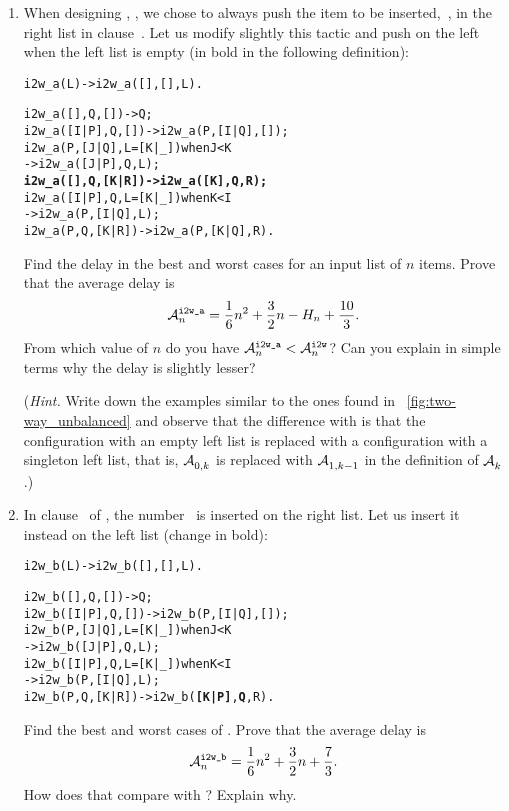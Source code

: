 
\begin{enumerate}

  \item \label{ins:ex:1} When designing ,
    , we chose to always push the item
    to be inserted,~, in the right list in
    clause~\clause{\epsilon}. Let us modify slightly this tactic and
    push on the left when the left list is empty (in bold in the
    following definition):
\begin{alltt}
i2w_a(L) -> i2w_a([],[],L).

i2w_a(   [],    Q,     []) -> Q;
i2w_a([I|P],    Q,     []) -> i2w_a(    P,[I|Q],[]);
i2w_a(    P,[J|Q],L=[K|_]) when J < K 
                           -> i2w_a([J|P],    Q, L);
\textbf{i2w_a(   [],    Q,  [K|R]) -> i2w_a(  [K],    Q, R);}
i2w_a([I|P],    Q,L=[K|_]) when K < I
                           -> i2w_a(    P,[I|Q], L);
i2w_a(    P,    Q,  [K|R]) -> i2w_a(    P,[K|Q], R).
\end{alltt}
Find the delay in the best and worst cases for an input list of \(n\)
items. Prove that the average delay is
\[
\ave{i2w\_a}{n} = \frac{1}{6}{n^2} + \frac{3}{2}{n} - H_n +
\frac{10}{3}.
\]
From which value of \(n\) do you have \(\ave{i2w\_a}{n} <
\ave{i2w}{n}\)? Can you explain in simple terms why the delay is
slightly lesser?

\noindent (\emph{Hint.} Write down the examples similar to the ones
found in \fig~\vref{fig:two-way_unbalanced} and observe that the
difference with  is that the configuration with an
empty left list is replaced with a configuration with a singleton left
list, that is, \(\ave{}{0,k}\) is replaced with \(\ave{}{1,k-1}\) in the
definition of \(\ave{}{k}\).)

  \item In clause~\clause{\epsilon} of , the
    number~ is inserted on the right list. Let us insert it
    instead on the left list (change in bold):
\begin{alltt}
i2w_b(L) -> i2w_b([],[],L).

i2w_b(   [],    Q,     []) -> Q;
i2w_b([I|P],    Q,     []) -> i2w_b(    P,[I|Q],[]);
i2w_b(    P,[J|Q],L=[K|_]) when J < K 
                           -> i2w_b([J|P],    Q, L);
i2w_b([I|P],    Q,L=[K|_]) when K < I
                           -> i2w_b(    P,[I|Q], L);
i2w_b(    P,    Q,  [K|R]) -> i2w_b(\textbf{[K|P]},    \textbf{Q}, R).
\end{alltt}
    Find the best and worst cases of . Prove that
    the average delay is
    \[
      \ave{i2w\_b}{n} = \frac{1}{6}{n^2} + \frac{3}{2}{n} + 
      \frac{7}{3}.
    \] 
    How does that compare with ? Explain why.


\end{enumerate}
